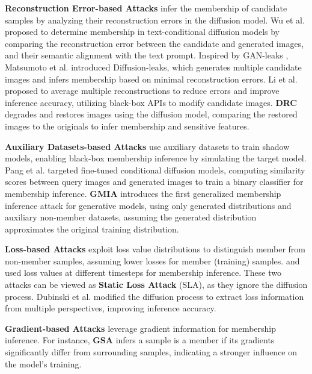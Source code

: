 \textbf{Reconstruction Error-based Attacks} infer the membership of candidate samples by analyzing their reconstruction errors in the diffusion model. Wu et al. \cite{wu2022membership} proposed to determine membership in text-conditional diffusion models by comparing the reconstruction error between the candidate and generated images, and their semantic alignment with the text prompt.
Inspired by GAN-leaks \cite{chen2020gan}, Matsumoto et al. \cite{matsumoto2023membership} introduced Diffusion-leaks, which generates multiple candidate images and infers membership based on minimal reconstruction errors. Li et al. \cite{li2024towards} proposed to average multiple reconstructions to reduce errors and improve inference accuracy, utilizing black-box APIs to modify candidate images.
\textbf{DRC} \cite{fu2024model} degrades and restores images using the diffusion model, comparing the restored images to the originals to infer membership and sensitive features.

\textbf{Auxiliary Datasets-based Attacks} use auxiliary datasets to train shadow models, enabling black-box membership inference by simulating the target model. 
Pang et al. \cite{pang2023black} targeted fine-tuned conditional diffusion models, computing similarity scores between query images and generated images to train a binary classifier for membership inference. \textbf{GMIA} \cite{zhang2024generated} introduces the first generalized membership inference attack for generative models, using only generated distributions and auxiliary non-member datasets, assuming the generated distribution approximates the original training distribution.

\textbf{Loss-based Attacks} exploit loss value distributions to distinguish member from non-member samples, assuming lower losses for member (training) samples. \cite{hu2023loss} and \cite{matsumoto2023membership} used loss values at different timesteps for membership inference. These two attacks can be viewed as \textbf{Static Loss Attack} (SLA), as they ignore the diffusion process. Dubinski et al. \cite{dubinski2024towards} modified the diffusion process to extract loss information from multiple perspectives, improving inference accuracy.

\textbf{Gradient-based Attacks} leverage gradient information for membership inference. For instance, \textbf{GSA} \cite{pang2023white} infers a sample is a member if its gradients significantly differ from surrounding samples, indicating a stronger influence on the model's training.

